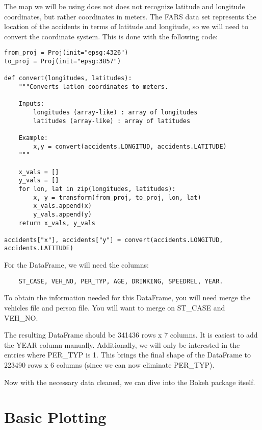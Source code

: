 \begin{problem} \label{prob:convert}
The map we will be using does not does not recognize latitude and longitude
coordinates, but rather coordinates in meters. The FARS data set represents
the location of the accidents in terms of latitude and longitude, so we will
need to convert the coordinate system. This is done with the following code:

\begin{lstlisting}
from_proj = Proj(init="epsg:4326")
to_proj = Proj(init="epsg:3857")

def convert(longitudes, latitudes):
    """Converts latlon coordinates to meters.

    Inputs:
        longitudes (array-like) : array of longitudes
        latitudes (array-like) : array of latitudes

    Example:
        x,y = convert(accidents.LONGITUD, accidents.LATITUDE)
    """

    x_vals = []
    y_vals = []
    for lon, lat in zip(longitudes, latitudes):
        x, y = transform(from_proj, to_proj, lon, lat)
        x_vals.append(x)
        y_vals.append(y)
    return x_vals, y_vals

accidents["x"], accidents["y"] = convert(accidents.LONGITUD, accidents.LATITUDE)
\end{lstlisting}
\end{problem}

\begin{problem}
For the  DataFrame, we will need the columns:
\begin{lstlisting}
    ST_CASE, VEH_NO, PER_TYP, AGE, DRINKING, SPEEDREL, YEAR.
\end{lstlisting}
To obtain the information needed
for this DataFrame, you will need merge the vehicles
file and person file. You will want to merge on ST\_CASE and VEH\_NO.

The resulting DataFrame should be 341436 rows x 7 columns. It is easiest to add
the YEAR column manually. Additionally, we will
only be interested in the entries where PER\_TYP is 1. This brings the final
shape of the DataFrame to 223490 rows x 6 columns (since we can now eliminate
PER\_TYP).
\end{problem}

Now with the necessary data cleaned, we can dive into the Bokeh package itself.

\section*{Basic Plotting}

